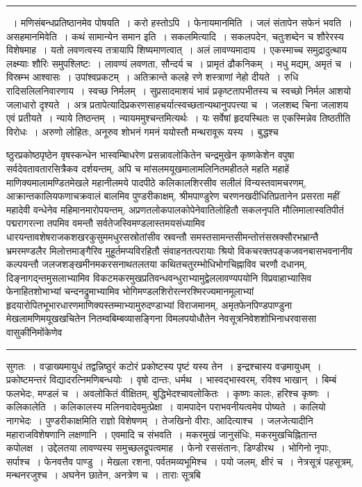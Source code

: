 \documentclass[11pt, openany]{book}
\begin{document}
\vspace{2mm}
\hrule

\noindent
{~। मणिसंबन्धप्रतिष्ठानमेव पोषयति~। करो हस्तोऽपि~। {\qtt फेनायमानमिति}~। जलं संतापेन सफेनं भवति~। असहमानमिवेति~। कथं सामान्येन समान इति~। {\qtt सकलमित्यादि}~। सकलपदेन, चतुःशब्देन च शौरेरस्य विशेषमाह~। यतो लवणत्वस्य तत्रायापि शिष्यमाणत्वात्~। अलं लावण्यमादाय~। एकस्माच्च समुद्रादुत्थाय लक्ष्म्याः शौरिः समुपश्लिष्टः~। लावण्यं लवणता, सौन्दर्य च~। प्रामृतं ढौकनिकम्~। मधु मद्यम्, अमृतं च~। विस्रम्भ आश्वासः~। उपांश्वप्रकटम्~। अतिक्रान्ते कलहे रणे शस्त्राणां नेहो दीयते~। रुधि रादिसलिलनिवारणाय~। स्वच्छ निर्मलम्~। सुप्रसादमाशयं भावं प्रकृष्टतापभीतस्य च स्वच्छो निर्मल आशयो जलाधारो दृश्यते~। अत्र प्रतापेत्यादिप्रकरणसाहचर्यात्स्वच्छतान्यथानुपपत्त्या च~। जलशब्द चिना जलाशय एवं प्रतीयते~। न्याये तिष्ठन्तम्~। न्यायममुश्चन्तमित्यर्थः~। यः सर्वेषां हृदयस्थितः स एकस्मिन्नेव तिष्ठतीति विरोधः~। अरुणो लोहितः, अनूरुव शोभनं गमनं ययोस्तौ मन्थरावूरू यस्य~। बुद्धश्च}

\newpage

\noindent
ष्ठुरप्रकोष्ठपृष्ठेन वृषस्कन्धेन भास्वम्बिाधरेण प्रसन्नावलोकितेन चन्द्रमुखेन कृष्णकेशेन वपुषा सर्वदेवतावतारसित्रैकव दर्शयन्तम्, अपि च मांसलमयूखमालामलिनितमहीतले महति महाहें माणिक्यमालामण्डितमेखले महानीलमये पादपीठे कलिकालशिरसीव सलीलं विन्यस्तवामचरणम्, आक्रान्तकालियफणाचक्रवालं बालमिव पुण्डरीकाक्षम्, श्रीमपाण्डुरेण चरणनखदीधितिप्रतानेन प्रसरता महीं महादेवी वन्धेनेव महिमानमारोपयन्तम्, अप्रणतलोकपालकोपेनेवातिलोहितौ सकलनृपति मौलिमालास्वतिपीतं पद्मरागरत्ना तपमिव वमन्तौ सर्वतेजस्विमण्डलास्तमयसंध्यामिव धारयन्तावशेषराजकशखरकुसुममधुरसस्रोतांसीव स्रवन्तौ समस्तसामन्तसीमन्तोत्तंसस्रक्सौरभभ्रान्तै भ्रमरमण्डलैर मिलोत्तमाङ्गैरिव मुहूर्तमप्यविरहितौ संवाहनतत्परायाः श्रियो विकचरक्तपङ्कजवनबासभवनानीव कल्पयन्तौ जलजशङ्खमीनमकरसनाथतलतया कथितचतुरम्भोधिभोगचिह्नाविव चरणौ दधानम्, दिङ्नागद्न्तमुसलाभ्यामिव विकटमकरमुखप्रतिवन्धवन्धुराभ्यामुद्वेललावण्यपयोनि विप्रवाहाभ्यासिव फेनाहितशोभाभ्यां चन्दनद्रुमाभ्यामिव भोगिमण्डलशिरोरत्नरश्मिरज्यमानमूलाभ्यां हृदयारोपितभूभारधारणमाणिक्यस्तम्माभ्यामुरुदण्डाभ्यां विराजमानम्, अमृतफेनपिण्डपाण्डुना मेखलामणिमयूखखचितेन नितम्वबिम्बव्यासङ्गिना विमलपयोधौतेन नेवसूत्रनिवेशशोभिनाधरवाससा वासुकीनिमोंकेणेव

\vspace{2mm}
\hrule

\noindent
{\s सुगतः~। वज्राख्यमायुधं तद्वन्निष्ठुरं कटोरं प्रकोष्टस्य पृष्टं यस्य तेन~। इन्द्रश्चास्य वज्रमायुधम्~। {\qt प्रकोष्टमन्तरं विद्यादरत्निमणिबन्धयोः}~। वृषो दान्तः, धर्मथ~। भास्वद्भास्वरम्, रविश्व भाखान्~। बिम्बं फलभेदः, मण्डलं च~। अवलोकितं वीक्षितम्, बुद्धिभेदश्चावलोकितः~। कृष्णः कालः, हरिश्च कृष्णः~। {\qtt कलिकालेति}~। कलिकालस्य मलिनवादेवमुत्प्रेक्षा~। वामपादेन पराभवनीयत्वमेव पोष्यते~। कालियो नागभेदः~। पुण्डरीकाक्षमिति राज्ञो विशेषणम्~। तेजखिनो वीराः, आदित्याश्च~। जलजेत्यादीनि महाराजविशेषणानि लक्षणानि~। एवमादि च संभवति~। मकरमुखं जानुसंधिः, मकरमुखचिह्नितान्त कपोलक्ष~। उद्देलतया लावण्यस्य समुच्छलद्रूपत्वमाह~। फेनो रससंतानः, डिण्डीरथ~। भोगिनो नृपाः, सर्पाश्च~। फेनवत्तैव पाण्डु~। मेखला रशना, पर्वतमव्यभूमिश्च~। पयो जलम्, क्षीरं च~। नेत्रसूत्रं पहसूत्रम्, मन्थनरजुश्च~। अघनेन छातेन, अनत्रेण च~। ताराः सूत्रबि\textendash}
\end{document}
